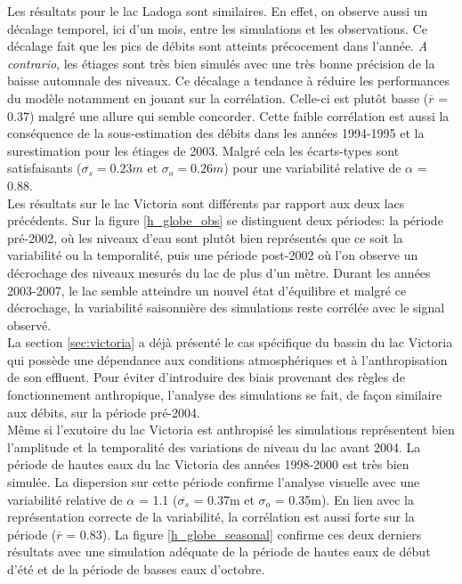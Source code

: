 Les résultats pour le lac Ladoga sont similaires. En effet, on observe aussi un décalage temporel, ici d'un mois, entre les simulations et les observations. Ce décalage fait que les pics de débits sont atteints précocement dans l'année. \textit{A contrario}, les étiages sont très bien simulés avec une très bonne précision de la baisse automnale des niveaux. Ce décalage a tendance à réduire les performances du modèle notamment en jouant sur la corrélation. Celle-ci est plutôt basse ($\overline{r}$ = 0.37) malgré une allure qui semble concorder. Cette faible corrélation est aussi la conséquence de la sous-estimation des débits dans les années 1994-1995 et la surestimation pour les étiages de 2003. Malgré cela les écarts-types sont satisfaisants ($\overline{\sigma_{s}}=0.23m$ et $\sigma_{o}=0.26m$) pour une variabilité relative de $\alpha$ = 0.88. \\

Les résultats sur le lac Victoria sont différents par rapport aux deux lacs précédents. Sur la figure \ref{h_globe_obs} se distinguent deux périodes: la période pré-2002, où les niveaux d'eau sont plutôt bien représentés que ce soit la variabilité ou la temporalité, puis une période post-2002 où l'on observe un décrochage des niveaux mesurés du lac de plus d'un mètre. Durant les années 2003-2007, le lac semble atteindre un nouvel état d'équilibre et malgré ce décrochage, la variabilité saisonnière des simulations reste corrélée avec le signal observé.\\
La section \ref{sec:victoria} a déjà présenté le cas spécifique du bassin du lac Victoria qui possède une dépendance aux conditions atmosphériques et à l'anthropisation de son effluent. Pour éviter d'introduire des biais provenant des règles de fonctionnement anthropique, l'analyse des simulations se fait, de façon similaire aux débits, sur la période pré-2004.\\
Même si l'exutoire du lac Victoria est anthropisé les simulations représentent bien l'amplitude et la temporalité des variations de niveau du lac avant 2004. La période de hautes eaux du lac Victoria des années 1998-2000 est très bien simulée. La dispersion sur cette période confirme l'analyse visuelle avec une variabilité relative de $\alpha$ = 1.1 ($\overline{\sigma_{s}}$ = 0.37m et $\sigma_{o}$ = 0.35m). En lien avec la représentation correcte de la variabilité, la corrélation est aussi forte sur la période ($\overline{r}$ = 0.83). La figure \ref{h_globe_seasonal} confirme ces deux derniers résultats avec une simulation adéquate de la période de hautes eaux de début d'été et de la période de basses eaux d'octobre. 

